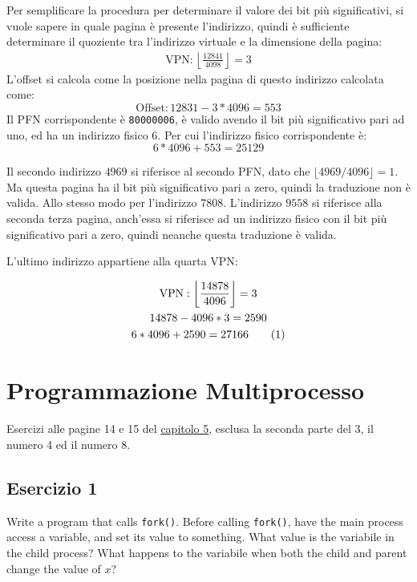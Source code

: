 \documentclass{article}
\numberwithin{equation}{subsection}
\newcommand{\tageq}{\tag{\stepcounter{equation}\theequation}}
\begin{document}
Per semplificare la procedura per determinare il valore dei bit più significativi, si vuole sapere in quale pagina è presente l'indirizzo, quindi è sufficiente determinare 
il quoziente tra l'indirizzo virtuale e la dimensione della pagina:
\begin{gather*}
    \mathrm{VPN}:\left\lfloor\displaystyle\frac{12841}{4098}\right\rfloor=3
\end{gather*}
L'offset si calcola come la posizione nella pagina di questo indirizzo calcolata come:
\begin{equation*}
    \mathrm{Offset}:12831-3*4096=553
\end{equation*}
Il PFN corrispondente è \verb|80000006|, è valido avendo il bit più significativo pari ad uno, ed ha un indirizzo fisico 6. Per cui l'indirizzo fisico corrispondente è:
\begin{equation}
    6*4096+553=25129
\end{equation}

Il secondo indirizzo $4969$ si riferisce al secondo PFN, dato che $\lfloor4969/4096\rfloor=1$. Ma questa pagina ha il bit più significativo pari a zero, quindi la traduzione 
non è valida. Allo stesso modo per l'indirizzo $7808$. L'indirizzo $9558$ si riferisce alla seconda terza pagina, anch'essa si riferisce ad un indirizzo fisico con 
il bit più significativo pari a zero, quindi neanche questa traduzione è valida. 

L'ultimo indirizzo appartiene alla quarta VPN: 

\begin{gather*}
    \mathrm{VPN}:\left\lfloor\displaystyle\frac{14878}{4096}\right\rfloor=3\\
    14878-4096*3=2590\\
    6*4096+2590=27166\tageq
\end{gather*}

\clearpage

\section{Programmazione Multiprocesso}

Esercizi alle pagine 14 e 15 del \href{https://pages.cs.wisc.edu/~remzi/OSTEP/cpu-api.pdf}{capitolo 5}, esclusa la seconda parte del 3, il numero 4 ed il numero 8.

\subsection{Esercizio 1}
Write a program that calls \verb|fork()|. Before calling \verb|fork()|, have the main process access a variable, and set its value to something. What 
value is the variabile in the child process? What happens to the variabile when both the child and parent change the value of $x$?
\end{document}
